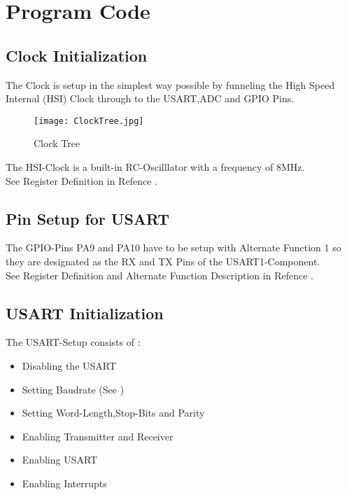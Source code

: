 \section{Program Code}

\subsection{Clock Initialization}

The Clock is setup in the simplest way possible by funneling the High Speed Internal (HSI) Clock through to the USART,ADC and GPIO Pins.

\begin{figure}[!ht]
	\texttt{[image: ClockTree.jpg]}
	\caption{Clock Tree}
\end{figure}

\pagebreak

The HSI-Clock is a built-in RC-Oscilllator with a frequency of 8MHz.\\
See Register Definition in Refence .



\pagebreak

\subsection{Pin Setup for USART}

The GPIO-Pins PA9 and PA10 have to be setup with Alternate Function 1 so they are designated as the RX and TX Pins of the USART1-Component.\\
See Register Definition and Alternate Function Description in Refence .



\pagebreak

\subsection{USART Initialization}

The USART-Setup consists of :
\begin{itemize}
	\item Disabling the USART
	\item Setting Baudrate (See )
	\item Setting Word-Length,Stop-Bits and Parity
	\item Enabling Transmitter and Receiver
	\item Enabling USART
	\item Enabling Interrupts
\end{itemize}

